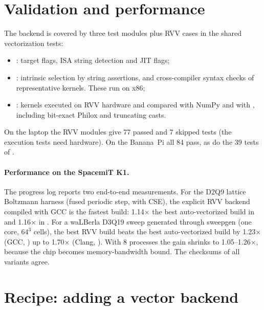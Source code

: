 \section{Validation and performance}

The backend is covered by three test modules plus RVV cases in the shared vectorization
tests:
\begin{itemize}
  \item {}: target flags, ISA string detection and
        JIT flags;
  \item {}: intrinsic selection by string
        assertions, and cross-compiler syntax checks of representative kernels. These
        run on x86;
  \item {}: kernels executed on RVV hardware and
        compared with NumPy and with , including bit-exact Philox and
        truncating casts.
\end{itemize}
On the laptop the RVV modules give 77 passed and 7 skipped tests (the execution tests
need hardware). On the Banana~Pi all 84 pass, as do the 39 tests of
.

\paragraph{Performance on the SpacemiT K1.}
The progress log reports two end-to-end measurements. For the D2Q9 lattice Boltzmann
harness  (fused periodic step, with
CSE), the explicit RVV backend compiled with GCC is the fastest build: 1.14$\times$ the
best auto-vectorized build in  and 1.16$\times$ in . For a
waLBerla D3Q19 sweep generated through sweepgen (one core, $64^3$ cells), the best RVV
build beats the best auto-vectorized build by 1.23$\times$ (GCC, ) up to
1.70$\times$ (Clang, ). With 8 processes the gain shrinks to
1.05--1.26$\times$, because the chip becomes memory-bandwidth bound. The 
checksums of all variants agree.

\section{Recipe: adding a vector backend}\label{sec:new-backend}

